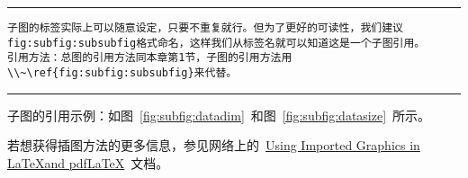 \noindent\hrule

\begin{verbatim}
子图的标签实际上可以随意设定，只要不重复就行。但为了更好的可读性，我们建议fig:subfig:subsubfig格式命名，这样我们从标签名就可以知道这是一个子图引用。
引用方法：总图的引用方法同本章第1节，子图的引用方法用\\~\ref{fig:subfig:subsubfig}来代替。
\end{verbatim}

\noindent\hrule\vspace{1em}

子图的引用示例：如图~\ref{fig:subfig:datadim}~和图~\ref{fig:subfig:datasize}~所示。

若想获得插图方法的更多信息，参见网络上的~\href{ftp://ftp.tex.ac.uk/tex-archive/info/epslatex.pdf}{Using Imported Graphics in \LaTeX and pdf\LaTeX}~文档。 